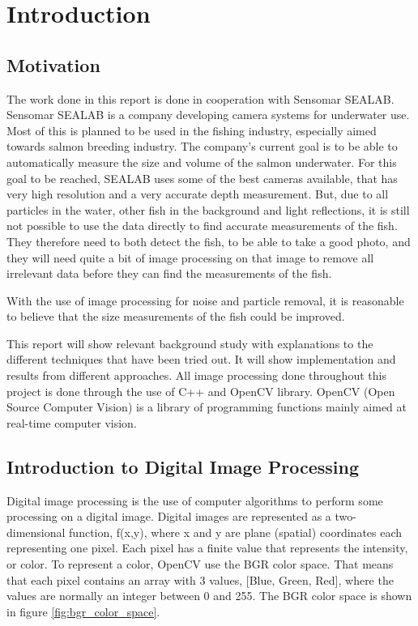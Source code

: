 \section{Introduction}\label{introduction}

\subsection{Motivation}\label{motivation}
The work done in this report is done in cooperation with Sensomar SEALAB.
Sensomar SEALAB is a company developing camera systems for underwater use. Most of this is planned to be used in the fishing industry, especially aimed towards salmon breeding industry. The company's current goal is to be able to automatically measure the size and volume of the salmon underwater. For this goal to be reached, SEALAB uses some of the best cameras available, that has very high resolution and a very accurate depth measurement. But, due to all particles in the water, other fish in the background and light reflections, it is still not possible to use the data directly to find accurate measurements of the fish. They therefore need to both detect the fish, to be able to take a good photo, and they will need quite a bit of image processing on that image to remove all irrelevant data before they can find the measurements of the fish. 

With the use of image processing for noise and particle removal, it is reasonable to believe that the size measurements of the fish could be improved.

This report will show relevant background study with explanations to the different techniques that have been tried out. It will show implementation and results from different approaches. All image processing done throughout this project is done through the use of C++ and OpenCV library. OpenCV (Open Source Computer Vision) is a library of programming functions mainly aimed at real-time computer vision. \cite{website:opencv_wiki}


\subsection{Introduction to Digital Image Processing}

Digital image processing is the use of computer algorithms to perform some processing on a digital image. 
Digital images are represented as a two-dimensional function, f(x,y), where x and y are plane (spatial) coordinates each representing one pixel. Each pixel has a finite value that represents the intensity, or color. To represent a color, OpenCV use the BGR color space. That means that each pixel contains an array with 3 values, [Blue, Green, Red], where the values are normally an integer between 0 and 255. The BGR color space is shown in figure \ref{fig:bgr_color_space}.

